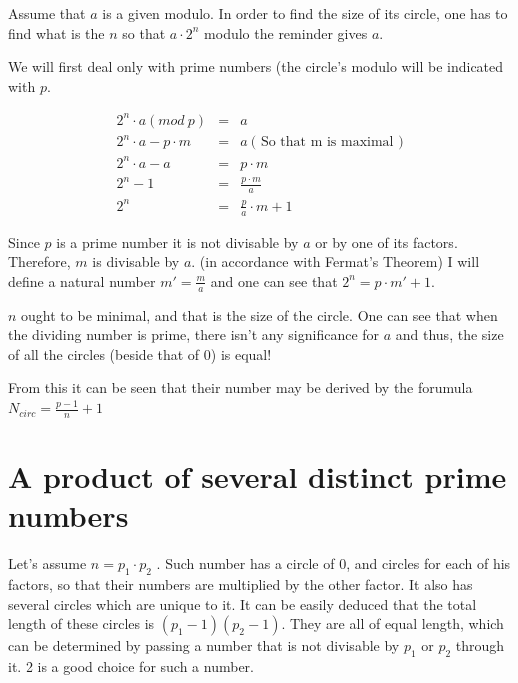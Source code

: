 \documentclass[a4paper]{report}
\begin{document}
Assume that $ a $ is a given modulo. In order to find the size of its
circle, one has to find what is the $ n $ so that $ a\cdot2^{n} $ modulo
the reminder gives $ a $.

We will first deal only with prime numbers (the circle's modulo will be 
indicated with $ p $.

\begin{eqnarray*}
2^{n} \cdot a (mod ~ p) & = & a
\\
2^{n} \cdot a - p \cdot m & = & a  ~  \mbox{( So that m is maximal )}
\\
2^{n} \cdot a - a & = & p \cdot m
\\
2^{n} - 1 & = & \frac{p \cdot m}{a}
\\
2^{n} & = & \frac{p}{a} \cdot m + 1
\end{eqnarray*}

Since $ p $ is a prime number it is not divisable by $ a $ or by
one of its factors. Therefore, $ m $ is divisable by $ a $. (in accordance
with Fermat's Theorem) I will define a natural number $ m' = \frac{m}{a} $
and one can see that $ 2^{n} = p \cdot m' + 1 $.

$ n $ ought to be minimal, and that is the size of the circle. One can
see that when the dividing number is prime, there isn't any significance
for $ a $ and thus, the size of all the circles (beside that of 0) is 
equal!

From this it can be seen that their number may be derived by the forumula
$ N_{circ}=\frac{p-1}{n}+1 $

\section{A product of several distinct prime numbers}

Let's assume $ n = p_{1} \cdot p_{2} $ . Such number has a circle of 0,
and circles for each of his factors, so that their numbers are multiplied
by the other factor. It also has several circles which are unique to it.
It can be easily deduced that the total length of these circles is
$ (p_{1} - 1)(p_{2} - 1) $. They are all of equal length, which can be determined
by passing a number that is not divisable by $ p_{1} $ or $ p_{2} $ through
it. 2 is a good choice for such a number.
\end{document}
